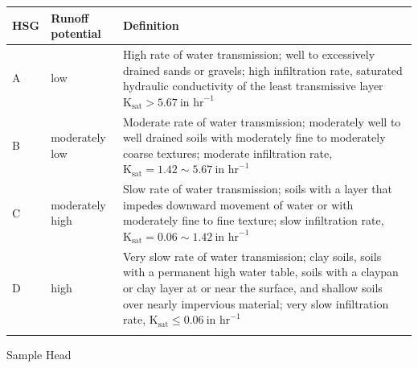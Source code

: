 \begin{table}
{\begin{tabular*}{\textwidth}{@{\extracolsep{\fill}}ll@{\raggedright}p{20pc}@{}}
\dtoprule
HSG & Runoff potential & \multicolumn{1}{l}{Definition} \\
\midrule
A & low & \multicolumn{1}{p{20pc}}{\raggedright High rate of water transmission; well to excessively drained sands or gravels; high infiltration rate, saturated hydraulic conductivity of the least transmissive layer $\textrm{K}_{\textrm{sat}} > 5.67\ \textrm{in\ hr}^{-1}$} \\[6pt]
B & moderately low &
\multicolumn{1}{p{20pc}}{\raggedright Moderate rate of water transmission; moderately well to well drained soils with moderately fine to moderately coarse textures; moderate infiltration rate, $\textrm{K}_{\textrm{sat}} = 1.42 \sim 5.67\ \textrm{in\ hr}^{ -1}$} \\[6pt]
C& moderately high&
\multicolumn{1}{p{20pc}}{\raggedright Slow rate of water transmission; soils with a layer that impedes downward movement of water or with moderately fine to fine texture; slow infiltration rate, $\textrm{K}_{\textrm{sat}} = 0.06 \sim 1.42\ \textrm{in\ hr}^{-1}$} \\[6pt]
D& high&
\multicolumn{1}{p{20pc}}{\raggedright Very slow rate of water transmission; clay soils, soils with a permanent high water table, soils with a claypan or clay layer at or near the surface, and shallow soils over nearly impervious material; very slow infiltration rate, $\textrm{K}_{\textrm{sat}} \le 0.06\ \textrm{in\ hr}^{ -1}$} \\
\dbottomrule
\end{tabular*}}
{}
\end{table}

\lipsum[5]
\lipsum[5]
\begin{lemma}
\lipsum[5]
\end{lemma}

\lipsum[5]

\lipsum[5]


\lipsum[5]

\begin{theorem}{Sample Head}
\lipsum[5]
\end{theorem}

\lipsum[5]

